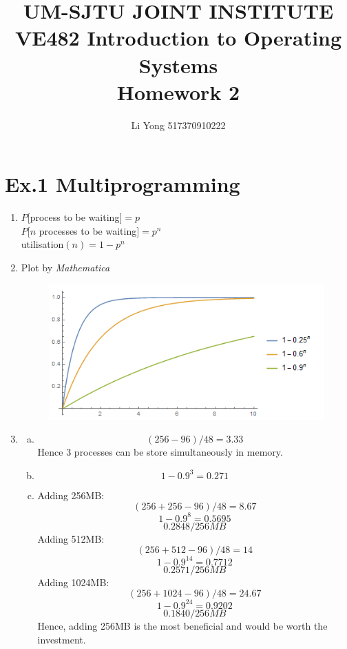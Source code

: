 \documentclass[a4paper]{article}
\title{UM-SJTU JOINT INSTITUTE\\VE482 Introduction to Operating Systems\\\vspace{0.5cm} Homework 2}
\author{Li Yong 517370910222}
\begin{document}
\maketitle
\newpage

\section*{Ex.1 Multiprogramming}
	\begin{enumerate}
		\item $P[$process to be waiting$] = p$\\
		$P[n$ processes to be waiting$] = p^n$\\
		utilisation$(n) = 1-p^n$
		\item Plot by \textit{Mathematica}
		\begin{figure}[ht]
			\centering
			\includegraphics[scale=0.7]{utilisation.png}
		\end{figure}
		\item
		\begin{enumerate}[a)]
			\item $$(256-96)/48=3.33$$
			Hence 3 processes can be store simultaneously in memory.
			\item $$1-0.9^3=0.271$$
			\item Adding 256MB:
			$$(256+256-96)/48=8.67$$
			$$1-0.9^8=0.5695$$
			$$0.2848/256MB$$
			Adding 512MB:
			$$(256+512-96)/48=14$$
			$$1-0.9^{14}=0.7712$$
			$$0.2571/256MB$$
			Adding 1024MB:
			$$(256+1024-96)/48=24.67$$
			$$1-0.9^{24}=0.9202$$
			$$0.1840/256MB$$
			Hence, adding 256MB is the most beneficial and would be worth the investment.
		\end{enumerate}
	\end{enumerate}
\end{document}
